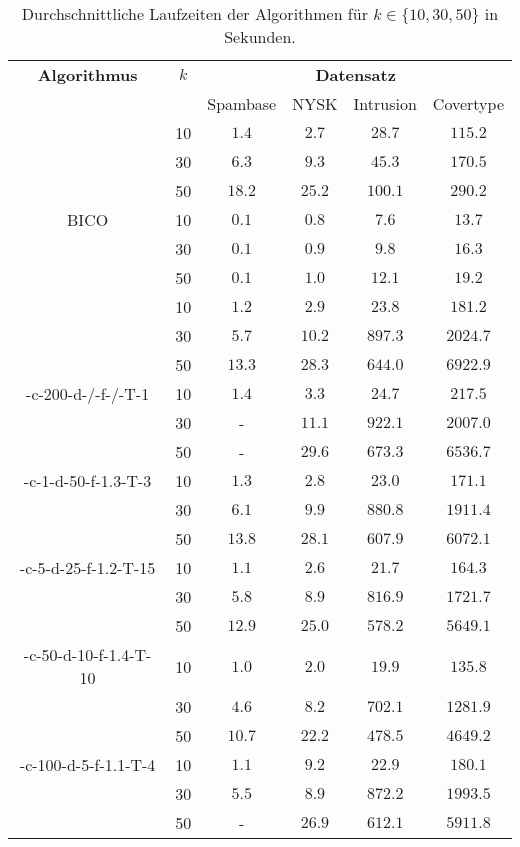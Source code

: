 \begin{table}[h]
\centering
\begin{tabular}{@{}cccccc@{}} \toprule
	\textbf{Algorithmus} & $k$ & \multicolumn{4}{c}{\textbf{Datensatz}} \\
	\cmidrule(r){3-6} & 		& Spambase 				& NYSK 				& Intrusion 			& Covertype \\ \toprule
	\Skmpp 						& 10 & $1.4$ 			& $2.7$ 			& $28.7$ 				& $115.2$ \\
		 						& 30 & $6.3$ 			& $9.3$ 			& $45.3$ 				& $170.5$ \\
		 						& 50 & $18.2$ 			& $25.2$ 			& $100.1$ 				& $290.2$ \\
	\midrule
	BICO 						& 10 & $0.1$ 			& $0.8$ 			& $7.6$ 				& $13.7$ \\
			 					& 30 & $0.1$ 			& $0.9$ 			& $9.8$ 				& $16.3$ \\
		 						& 50 & $0.1$ 			& $1.0$ 			& $12.1$ 				& $19.2$ \\
	\midrule
	\kmpp 						& 10 & $1.2$ 			& $2.9$ 			& $23.8$ 				& $181.2$ \\
			 					& 30 & $5.7$ 			& $10.2$ 			& $897.3$ 				& $2024.7$ \\
		 						& 50 & $13.3$ 			& $28.3$ 			& $644.0$ 				& $6922.9$ \\
	\midrule
	\KCsTwo-c-200-d-/-f-/-T-1	& 10 & $1.4$			& $3.3$				& $24.7$ 				& $217.5$ \\
			 					& 30 & - 				& $11.1$			& $922.1$ 				& $2007.0$ \\
		 						& 50 & - 				& $29.6$			& $673.3$ 				& $6536.7$ \\
	\midrule
	\KCsTwo-c-1-d-50-f-1.3-T-3	& 10 & $1.3$ 			& $2.8$ 			& $23.0$ 				& $171.1$ \\
			 					& 30 & $6.1$ 			& $9.9$ 			& $880.8$ 				& $1911.4$ \\
		 						& 50 & $13.8$ 			& $28.1$ 			& $607.9$ 				& $6072.1$ \\
	\midrule
	\KCsTwo-c-5-d-25-f-1.2-T-15	& 10 & $1.1$ 			& $2.6$ 			& $21.7$ 				& $164.3$ \\
			 					& 30 & $5.8$ 			& $8.9$ 			& $816.9$ 				& $1721.7$ \\
		 						& 50 & $12.9$ 			& $25.0$ 			& $578.2$ 				& $5649.1$ \\
	\midrule
	\KCsTwo-c-50-d-10-f-1.4-T-10& 10 & $1.0$ 			& $2.0$ 			& $19.9$ 				& $135.8$ \\
			 					& 30 & $4.6$ 			& $8.2$ 			& $702.1$ 				& $1281.9$ \\
		 						& 50 & $10.7$ 			& $22.2$ 			& $478.5$ 				& $4649.2$ \\
	\midrule
	\KCsTwo-c-100-d-5-f-1.1-T-4	& 10 & $1.1$ 			& $9.2$ 			& $22.9$ 				& $180.1$ \\
			 					& 30 & $5.5$ 			& $8.9$				& $872.2$ 				& $1993.5$ \\
		 						& 50 & - 				& $26.9$ 			& $612.1$ 				& $5911.8$ \\
	\bottomrule
\end{tabular}
\caption{Durchschnittliche Laufzeiten der Algorithmen für $k \in \{ 10, 30, 50 \}$ in Sekunden.}
\label{tbl:experiment-coresets-kernel-runtime}
\end{table}

